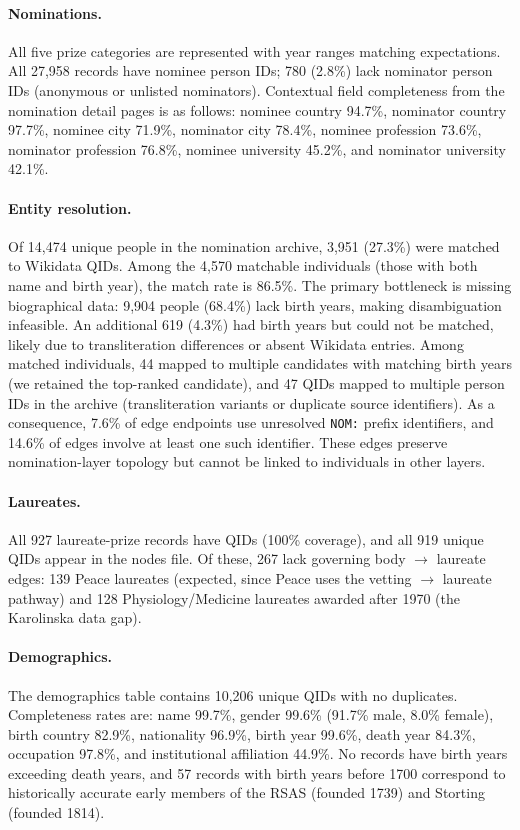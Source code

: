 \documentclass[12pt]{article}
\begin{document}
\paragraph*{Nominations.} All five prize categories are represented with year ranges matching expectations. All 27,958 records have nominee person IDs; 780 (2.8\%) lack nominator person IDs (anonymous or unlisted nominators). Contextual field completeness from the nomination detail pages is as follows: nominee country 94.7\%, nominator country 97.7\%, nominee city 71.9\%, nominator city 78.4\%, nominee profession 73.6\%, nominator profession 76.8\%, nominee university 45.2\%, and nominator university 42.1\%.

\paragraph*{Entity resolution.} Of 14,474 unique people in the nomination archive, 3,951 (27.3\%) were matched to Wikidata QIDs. Among the 4,570 matchable individuals (those with both name and birth year), the match rate is 86.5\%. The primary bottleneck is missing biographical data: 9,904 people (68.4\%) lack birth years, making disambiguation infeasible. An additional 619 (4.3\%) had birth years but could not be matched, likely due to transliteration differences or absent Wikidata entries. Among matched individuals, 44 mapped to multiple candidates with matching birth years (we retained the top-ranked candidate), and 47 QIDs mapped to multiple person IDs in the archive (transliteration variants or duplicate source identifiers). As a consequence, 7.6\% of edge endpoints use unresolved \texttt{NOM:} prefix identifiers, and 14.6\% of edges involve at least one such identifier. These edges preserve nomination-layer topology but cannot be linked to individuals in other layers.

\paragraph*{Laureates.} All 927 laureate-prize records have QIDs (100\% coverage), and all 919 unique QIDs appear in the nodes file. Of these, 267 lack governing body $\to$ laureate edges: 139 Peace laureates (expected, since Peace uses the vetting $\to$ laureate pathway) and 128 Physiology/Medicine laureates awarded after 1970 (the Karolinska data gap).

\paragraph*{Demographics.} The demographics table contains 10,206 unique QIDs with no duplicates. Completeness rates are: name 99.7\%, gender 99.6\% (91.7\% male, 8.0\% female), birth country 82.9\%, nationality 96.9\%, birth year 99.6\%, death year 84.3\%, occupation 97.8\%, and institutional affiliation 44.9\%. No records have birth years exceeding death years, and 57 records with birth years before 1700 correspond to historically accurate early members of the RSAS (founded 1739) and Storting (founded 1814).
\end{document}
